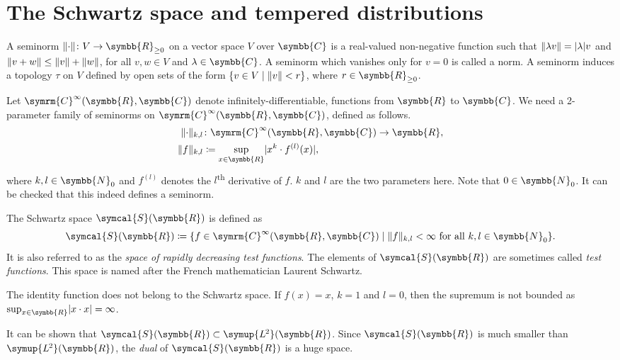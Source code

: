 \documentclass[12pt, a4 paper]{article}
\theoremstyle{definition}
\newcommand{\ltwo}{\symup{L\kern-0.5pt^2}}
\newcommand{\rr}{\symbb{R}}
\newcommand{\cc}{\symbb{C}}
\newcommand{\nn}{\symbb{N}_0}
\newcommand{\ltwor}{\ltwo(\rr)}
\newcommand{\schwartz}{\symcal{S}}
\newcommand{\schwartzr}{\schwartz(\rr)}
\newcommand{\cinfinity}{\symrm{C}^\infty}
\DeclarePairedDelimiter{\norm}{\lVert}{\rVert}
\DeclarePairedDelimiter{\abs}{\lvert}{\rvert}
\begin{document}
    \section{The Schwartz space and tempered distributions}

    A seminorm $\norm{\cdot} \colon V \rightarrow \rr_{\geq 0}$ on a vector space $V$ over $\cc$ is a real-valued non-negative function such that $\norm{\lambda v} = \abs{\lambda} v$ and $\norm{v + w} \leq \norm{v} + \norm{w}$, for all $v,w \in V$ and $\lambda \in \cc$. A seminorm which vanishes only for $v=0$ is called a norm. A seminorm induces a topology $\tau$ on $V$ defined by open sets of the form $\{v\in V \mid \norm{v} < r\}$, where $r \in \rr_{\geq 0}$.

    Let $\cinfinity(\rr, \cc)$ denote infinitely-differentiable, functions from $\rr$ to $\cc$. We need a 2-parameter family of seminorms on $\cinfinity(\rr, \cc)$, defined as follows.
    \begin{align*}
        \norm{\cdot}_{k,l} &\colon \cinfinity(\rr, \cc) \rightarrow \rr,\\
        \norm{f}_{k,l} &\coloneq \sup_{x \in \rr}\abs{x^k \cdot f^{(l)}(x)},
    \end{align*}
    where $k, l \in \nn$ and $f^{(l)}$ denotes the $l$\textsuperscript{th} derivative of $f$. $k$ and $l$ are the two parameters here. Note that $0 \in \nn$. It can be checked that this indeed defines a seminorm.

    The Schwartz space $\schwartzr$ is defined as
    \[
    \schwartzr \coloneq \{f \in \cinfinity(\rr, \cc) \mid \norm{f}_{k,l} < \infty \text{ for all } k, l \in \nn\}.
    \]
    It is also referred to as the \textit{space of rapidly decreasing test functions}. The elements of $\schwartzr$ are sometimes called \textit{test functions}. This space is named after the French mathematician Laurent Schwartz.

    The identity function does not belong to the Schwartz space. If $f(x) = x$, $k=1$ and $l=0$, then the supremum is not bounded as $\sup_{x \in \rr} \abs{x \cdot x} = \infty$.

    It can be shown that $\schwartzr \subset \ltwor$. Since $\schwartzr$ is much smaller than $\ltwor$, the \textit{dual} of $\schwartzr$ is a huge space.
\end{document}

